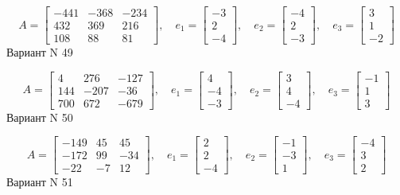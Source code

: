 \documentclass[11pt]{report}
\begin{document}
$$A = \left[\begin{matrix}-441 & -368 & -234\\432 & 369 & 216\\108 & 88 & 81\end{matrix}\right],\quad e_1 = \left[\begin{matrix}-3\\2\\-4\end{matrix}\right],\quad e_2 = \left[\begin{matrix}-4\\2\\-3\end{matrix}\right],\quad e_3 = \left[\begin{matrix}3\\1\\-2\end{matrix}\right]$$Вариант N 49

$$A = \left[\begin{matrix}4 & 276 & -127\\144 & -207 & -36\\700 & 672 & -679\end{matrix}\right],\quad e_1 = \left[\begin{matrix}4\\-4\\-3\end{matrix}\right],\quad e_2 = \left[\begin{matrix}3\\4\\-4\end{matrix}\right],\quad e_3 = \left[\begin{matrix}-1\\1\\3\end{matrix}\right]$$Вариант N 50

$$A = \left[\begin{matrix}-149 & 45 & 45\\-172 & 99 & -34\\-22 & -7 & 12\end{matrix}\right],\quad e_1 = \left[\begin{matrix}2\\2\\-4\end{matrix}\right],\quad e_2 = \left[\begin{matrix}-1\\-3\\1\end{matrix}\right],\quad e_3 = \left[\begin{matrix}-4\\3\\2\end{matrix}\right]$$Вариант N 51
\end{document}
